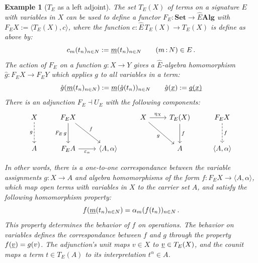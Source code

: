 \documentclass[11pt,oneside,draft]{book}
\newtheorem{example}[theorem]{Example}
\theoremstyle{definition}
\newcommand{\ul}[1]{%
  \underline{\smash{#1}}
}
\begin{document}
\begin{example}[$T_E$ as a left adjoint] %
The set $T_E(X)$ of terms on a signature $E$ with variables in $X$
can be used to define a functor
$F_E : \mathbf{Set} \rightarrow \hat{E} \mathbf{Alg}$
with $F_E X := \langle T_E(X), c \rangle$,
where the function
$c : \hat{E} \, T_E(X) \rightarrow T_E(X)$
is define as above by:
\[
  c_m(t_n)_{n \in N} := \ul{m}(t_n)_{n \in N}
  \qquad
  (m \mathop{:} N) \in E
  \,.
\]
The action of $F_E$ on a function $g : X \rightarrow Y$
gives a $\hat{E}$-algebra homomorphism
$\hat{g} : F_E X \rightarrow F_E Y$
which applies $g$ to all variables in a term:
\[
  \hat{g}(\ul{m}(t_n)_{n \in N}) := \ul{m}(\hat{g}(t_n))_{n \in N}
  \qquad
  \hat{g}(\ul{x}) := \ul{g(x)}
\]
There is an adjunction $F_E \dashv U_E$
with the following components:
\[
  \begin{tikzcd}[row sep=large]
    X \ar[d, "g"', dashed] &
    F_E X \ar[d, "F_E \, g"'] \ar[dr, "f"] &
    &
    X \ar[r, "\eta_X"] \ar[dr, "g"'] &
    T_E(X) \ar[d, "f"] &
    F_E X \ar[d, "f", dashed]
    \\
    A &
    F_E A \ar[r, "\varepsilon_\alpha"'] &
    \langle A, \alpha \rangle &
    &
    A &
    \langle A, \alpha \rangle
  \end{tikzcd}
\]

In other words,
there is a one-to-one correspondance between
the variable assignments
$g : X \rightarrow A$
and algebra homomorphisms of the form
$f : F_E X \rightarrow \langle A, \alpha \rangle$,
which map open terms with variables in $X$ to
the carrier set $A$,
and satisfy
the following homomorphism property:
\[
  f(\ul{m}(t_n)_{n \in N}) = \alpha_m(f(t_n))_{n \in N}
  \,.
\]
This property determines the behavior of $f$ on operations.
The behavior on variables
defines the correspondance between $f$ and $g$
through the property $f(\ul{v}) = g(v)$.
The adjunction's unit maps $v \in X$ to $\ul{v} \in T_E(X)$,
and the counit maps a term $t \in T_E(A)$
to its interpretation $t^\alpha \in A$.
\end{example}
\end{document}
